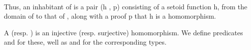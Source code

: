 \begin{code}%
\>[0]\<%
\\
\>[0][@{}l@{\AgdaIndent{1}}]%
\>[1]\AgdaSpace{}%
\AgdaSpace{}%
\AgdaSymbol{(}\AgdaSpace{}%
\AgdaSymbol{:}\AgdaSpace{}%
\AgdaOperator{\AgdaFunction{𝔻[}}\AgdaSpace{}%
\AgdaSpace{}%
\AgdaOperator{\AgdaFunction{]}}\AgdaSpace{}%
\AgdaSpace{}%
\AgdaOperator{\AgdaFunction{𝔻[}}\AgdaSpace{}%
\AgdaSpace{}%
\AgdaOperator{\AgdaFunction{]}}\AgdaSymbol{)}\AgdaSpace{}%
\AgdaSymbol{:}\AgdaSpace{}%
\AgdaSpace{}%
\AgdaSymbol{(}\AgdaSpace{}%
\AgdaSpace{}%
\AgdaSpace{}%
\AgdaSpace{}%
\AgdaSpace{}%
\AgdaSpace{}%
\AgdaSymbol{)}\AgdaSpace{}%
\<%
\\
\>[1][@{}l@{\AgdaIndent{0}}]%
\>[2]\AgdaSpace{}%
\AgdaSpace{}%
\AgdaSymbol{;}\AgdaSpace{}%
\AgdaSpace{}%
\AgdaSpace{}%
\AgdaSymbol{:}\AgdaSpace{}%
\AgdaSpace{}%
\<%
\\
%
\\[\AgdaEmptyExtraSkip]%
%
\>[1]\AgdaSpace{}%
\AgdaSymbol{:}\AgdaSpace{}%
\AgdaSpace{}%
\AgdaSymbol{\AgdaUnderscore{}}\<%
\\
%
\>[1]\AgdaSpace{}%
\AgdaSymbol{=}\AgdaSpace{}%
\AgdaSpace{}%
\AgdaSymbol{(}\AgdaOperator{\AgdaFunction{𝔻[}}\AgdaSpace{}%
\AgdaSpace{}%
\AgdaOperator{\AgdaFunction{]}}\AgdaSpace{}%
\AgdaSpace{}%
\AgdaOperator{\AgdaFunction{𝔻[}}\AgdaSpace{}%
\AgdaSpace{}%
\AgdaOperator{\AgdaFunction{]}}\AgdaSymbol{)}\AgdaSpace{}%
\<%
\\
\>[0]\<%
\end{code}
Thus, an inhabitant of  is a pair (\ab h , \ab p) consisting of
a setoid function \ab h, from the domain of  to that of , along with
a proof \ab p that \ab h is a homomorphism.

A  (resp. ) is an injective (resp. surjective)
homomorphism. We define predicates  and  for these,
 well as  and  for the corresponding types.
\ifshort %
\else    %

